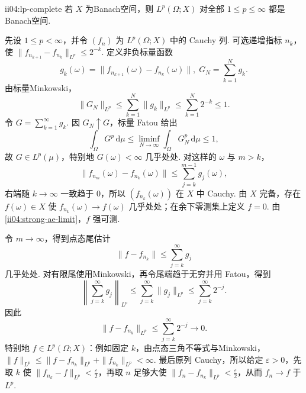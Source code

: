 \begin{FATheorem}{ii04:lp-complete}
若 \(\displaystyle X\) 为Banach空间，则 \(\displaystyle L^p(\Omega;X)\) 对全部 \(\displaystyle1\leqslant p\leqslant\infty\) 都是Banach空间.
\end{FATheorem}

\begin{FAProof}
先设 \(\displaystyle1\leqslant p<\infty\)，并令 \(\displaystyle(f_n)\) 为 \(\displaystyle L^p(\Omega;X)\) 中的 Cauchy 列. 可选递增指标 \(\displaystyle n_k\)，使
\(\displaystyle \|f_{n_{k+1}}-f_{n_k}\|_{L^p} \leqslant 2^{-k}.\)
定义非负标量函数
\[
g_k(\omega)=\|f_{n_{k+1}}(\omega)-f_{n_k}(\omega)\|,\;
G_N=\sum_{k=1}^{N}g_k.
\]
由标量Minkowski，
\[
\|G_N\|_{L^p}
\leqslant
\sum_{k=1}^{N}\|g_k\|_{L^p}
\leqslant
\sum_{k=1}^{N}2^{-k}
\leqslant1.
\]
令 \(\displaystyle G=\sum_{k=1}^{\infty}g_k\). 因 \(\displaystyle G_N\uparrow G\)，标量 Fatou 给出
\[
\int_\Omega G^p\,\mathrm{d}\mu
\leqslant
\liminf_{N\to\infty}
\int_\Omega G_N^p\,\mathrm{d}\mu
\leqslant1,
\]
故 \(\displaystyle G\in L^p(\mu)\)，特别地 \(\displaystyle G(\omega)<\infty\) 几乎处处. 对这样的 \(\displaystyle\omega\) 与 \(\displaystyle m>k\)，
\[
\|f_{n_m}(\omega)-f_{n_k}(\omega)\|
\leqslant
\sum_{j=k}^{m-1}g_j(\omega),
\]
右端随 \(\displaystyle k\to\infty\) 一致趋于 \(\displaystyle0\)，所以 \(\displaystyle(f_{n_k}(\omega))\) 在 \(\displaystyle X\) 中 Cauchy. 由 \(\displaystyle X\) 完备，存在 \(\displaystyle f(\omega)\in X\) 使 \(\displaystyle f_{n_k}(\omega)\to f(\omega)\) 几乎处处；在余下零测集上定义 \(\displaystyle f=0\). 由\autoref{ii04:strong-ae-limit}，\(\displaystyle f\) 强可测.

令 \(\displaystyle m\to\infty\)，得到点态尾估计
\[
\|f-f_{n_k}\|
\leqslant
\sum_{j=k}^{\infty}g_j
\]
几乎处处. 对有限尾使用Minkowski，再令尾端趋于无穷并用 Fatou，得到
\[
\left\|\sum_{j=k}^{\infty}g_j\right\|_{L^p}
\leqslant
\sum_{j=k}^{\infty}\|g_j\|_{L^p}
\leqslant
\sum_{j=k}^{\infty}2^{-j}.
\]
因此
\[
\|f-f_{n_k}\|_{L^p}
\leqslant
\sum_{j=k}^{\infty}2^{-j}
\longrightarrow0.
\]
特别地 \(\displaystyle f\in L^p(\Omega;X)\)：例如固定 \(\displaystyle k\)，由点态三角不等式与Minkowski，\(\displaystyle\|f\|_{L^p}\leqslant\|f-f_{n_k}\|_{L^p}+\|f_{n_k}\|_{L^p}<\infty\). 最后原列 Cauchy，所以给定 \(\displaystyle\varepsilon>0\)，先取 \(\displaystyle k\) 使 \(\displaystyle\|f_{n_k}-f\|_{L^p}<\frac{\varepsilon}{2}\)，再取 \(\displaystyle n\) 足够大使 \(\displaystyle\|f_n-f_{n_k}\|_{L^p}<\frac{\varepsilon}{2}\)，从而 \(\displaystyle f_n\to f\) 于 \(\displaystyle L^p\).


\end{FAProof}
